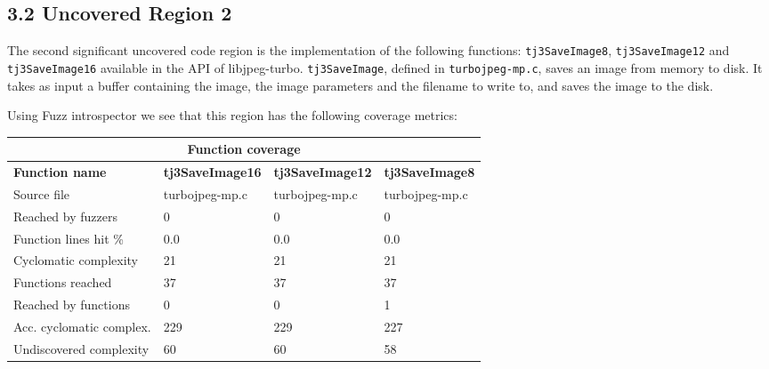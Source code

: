 \documentclass[12pt]{article}
\begin{document}

\subsection*{3.2 Uncovered Region 2}
The second significant uncovered code region is the implementation of the following functions: \texttt{tj3SaveImage8}, \texttt{tj3SaveImage12} and \texttt{tj3SaveImage16} available in the API of libjpeg-turbo. \texttt{tj3SaveImage}, defined in \texttt{turbojpeg-mp.c}, saves an image from memory to disk. It takes as input a buffer containing the image, the image parameters and the filename to write to, and saves the image to the disk.

\noindent Using Fuzz introspector we see that this region has the following coverage metrics:

\medskip
\tabcolsep=0.10cm
\noindent\begin{tabular}{ |p{4.9cm}||p{3.2cm}|p{3.2cm}|p{3.2cm}|  }
 \hline
 \multicolumn{4}{|c|}{Function coverage} \\
 \hline
 \textbf{Function name} & \textbf{tj3SaveImage16} & \textbf{tj3SaveImage12} & \textbf{tj3SaveImage8} \\
 \hline
 Source file & turbojpeg-mp.c & turbojpeg-mp.c  & turbojpeg-mp.c \\
 Reached by fuzzers &   0  & 0 & 0\\
 Function lines hit \% & 0.0 & 0.0 & 0.0\\
 Cyclomatic complexity & 21 & 21 & 21\\
 Functions reached & 37 & 37 & 37\\
 Reached by functions & 0 & 0 & 1 \\
 Acc. cyclomatic complex.& 229 & 229 & 227\\
 Undiscovered complexity & 60 & 60 & 58 \\
 \hline
\end{tabular}
\medskip
\end{document}

